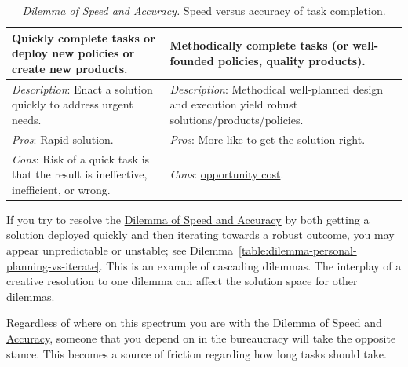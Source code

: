 
\begin{center}
\begin{table}[H] %
\begin{tabular}{ | m{\dilemmatablewidth}| m{\dilemmatablewidth} | } 
  \hline
  \textbf{Quickly complete tasks or deploy new policies or create new products.} & 
  \textbf{Methodically complete tasks (or well-founded policies, quality products).} \\ 
  \hline
  \textit{Description}: Enact a solution quickly to address urgent needs. &
  \textit{Description}: Methodical well-planned design and execution yield robust solutions/products/policies. \\
  \hline
  \textit{Pros}: Rapid solution. &
  \textit{Pros}: More like to get the solution right. \\
  \hline
  \textit{Cons}: Risk of a quick task is that the result is ineffective, inefficient, or wrong. &
  \textit{Cons}: \href{https://en.wikipedia.org/wiki/Opportunity_cost}{opportunity cost}. 
  \index{Wikipedia!\href{https://en.wikipedia.org/wiki/Opportunity_cost}{opportunity cost}}
  \\  
  \hline
\end{tabular}
\caption{
\textit{Dilemma of Speed and Accuracy.}
Speed versus accuracy of task completion.
}
\label{table:dilemma-personal-quick-methodical}
\end{table}
\end{center}

If you try to resolve the \hyperref[table:dilemma-personal-quick-methodical]{Dilemma of Speed and Accuracy} by both getting a solution deployed quickly and then iterating towards a robust outcome, you may appear unpredictable or unstable; see Dilemma~\ref{table:dilemma-personal-planning-vs-iterate}. This is an example of cascading dilemmas. The interplay of a creative resolution to one dilemma can affect the solution space for other dilemmas. 

Regardless of where on this spectrum you are with the \hyperref[table:dilemma-personal-quick-methodical]{Dilemma of Speed and Accuracy}, someone that you depend on in the bureaucracy will take the opposite stance. This becomes a source of friction regarding how long tasks should take. 

